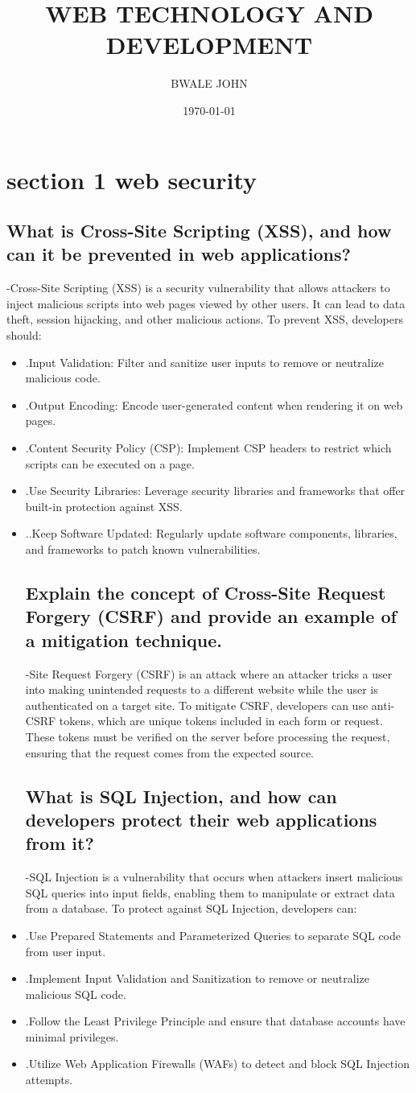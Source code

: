 \documentclass{article}
\author{BWALE JOHN}
\title{WEB TECHNOLOGY AND DEVELOPMENT}
\date{\today}
\begin{document}
\section{section 1 web security}
\subsection{What is Cross-Site Scripting (XSS), and how can it be prevented in web applications? }
-Cross-Site Scripting (XSS) is a security vulnerability that allows attackers to inject malicious scripts into web pages viewed by other users. It can lead to data theft, session hijacking, and other malicious actions. To prevent XSS, developers should:
\begin{itemize}

\item  .Input Validation: Filter and sanitize user inputs to remove or neutralize malicious code.
\item .Output Encoding: Encode user-generated content when rendering it on web pages.
\item .Content Security Policy (CSP): Implement CSP headers to restrict which scripts can be executed on a page.
\item .Use Security Libraries: Leverage security libraries and frameworks that offer built-in protection against XSS.
\item ..Keep Software Updated: Regularly update software components, libraries, and frameworks to patch known vulnerabilities.
\subsection{ Explain the concept of Cross-Site Request Forgery (CSRF) and provide an example of a mitigation technique.}
-Site Request Forgery (CSRF) is an attack where an attacker tricks a user into making unintended requests to a different website while the user is authenticated on a target site. To mitigate CSRF, developers can use anti-CSRF tokens, which are unique tokens included in each form or request. These tokens must be verified on the server before processing the request, ensuring that the request comes from the expected source.
\subsection{What is SQL Injection, and how can developers protect their web applications from it?}
-SQL Injection is a vulnerability that occurs when attackers insert malicious SQL queries into input fields, enabling them to manipulate or extract data from a database. To protect against SQL Injection, developers can:
\item .Use Prepared Statements and Parameterized Queries to separate SQL code from user input.
\item  .Implement Input Validation and Sanitization to remove or neutralize malicious SQL code.
\item .Follow the Least Privilege Principle and ensure that database accounts have minimal privileges.
\item .Utilize Web Application Firewalls (WAFs) to detect and block SQL Injection attempts.

\end{itemize}
\end{document}
